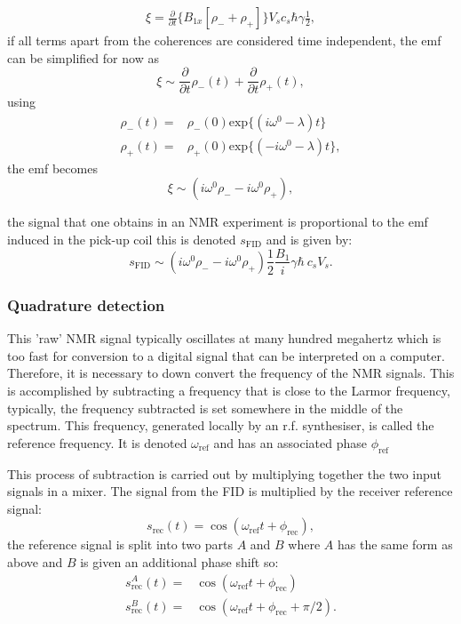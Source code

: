 \begin{align}
  \xi = \frac{\partial}{\partial{t}}\{B_{1x}[\rho_- + \rho_+]\}V_sc_s\hbar\gamma\frac{1}{2},
\end{align}
if all terms apart from the coherences are considered time independent, the emf can be simplified for now as
\begin{equation}
  \xi \sim \frac{\partial}{\partial{t}}\rho_-(t) + \frac{\partial}{\partial{t}}\rho_+(t),
\end{equation}
using 
\begin{align}
  \rho_-(t) =& \rho_-(0)\text{exp}\{(i\omega^0-\lambda)t\}\\
  \rho_+(t) =& \rho_+(0)\text{exp}\{(-i\omega^0-\lambda)t\},
\end{align}
the emf becomes
\begin{equation}
  \xi \sim (i\omega^0\rho_- - i\omega^0\rho_+),
\end{equation}

the signal that one obtains in an NMR experiment is proportional to the emf induced in the pick-up coil this
is denoted $s_\text{FID}$ and is given by:
\begin{equation}
  s_\text{FID} \sim (i\omega^0\rho_- - i\omega^0\rho_+)\frac{1}{2}\frac{B_1}{i}\gamma\hbar~c_sV_s.
\end{equation}

\subsubsection{Quadrature detection}

This 'raw' NMR signal typically oscillates at many hundred megahertz which is too fast for
conversion to a digital signal that can be interpreted on a computer. Therefore,
it is necessary to down convert the frequency of the NMR signals. This is accomplished
by subtracting a frequency that is close to the Larmor frequency, typically, the frequency
subtracted is set somewhere in the middle of the spectrum. This frequency, generated locally
by an r.f. synthesiser, is called the reference frequency. It is denoted $\omega_\text{ref}$ and has an associated
phase $\phi_\text{ref}$

This process of subtraction is carried out by  multiplying together the two input signals in a mixer.
The signal from the FID is multiplied by the receiver reference signal:
\begin{equation}
  s_{\text{rec}}(t) = \cos(\omega_{\text{ref}}t + \phi_{\text{rec}}),
\end{equation}
the reference signal is split into two parts $A$ and $B$ where $A$ has the same form as above and $B$ is
given an additional phase shift so:
\begin{align}
  s_{\text{rec}}^A(t) =& \cos(\omega_{\text{ref}}t + \phi_{\text{rec}})\\
  s_{\text{rec}}^B(t) =& \cos(\omega_{\text{ref}}t + \phi_{\text{rec}} + \pi/2).
\end{align}

